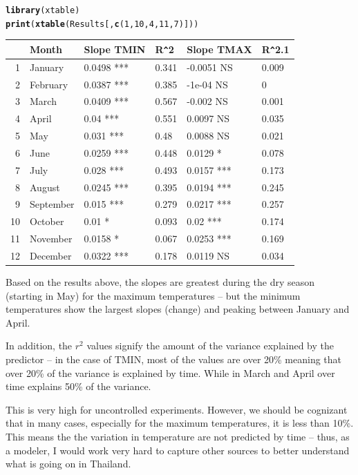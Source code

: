 \documentclass{article}\usepackage[]{graphicx}\usepackage[]{color}
\makeatletter
\newcommand{\hlnum}[1]{\textcolor[rgb]{0.686,0.059,0.569}{#1}}%
\newcommand{\hlstd}[1]{\textcolor[rgb]{0.345,0.345,0.345}{#1}}%
\newcommand{\hlkwd}[1]{\textcolor[rgb]{0.737,0.353,0.396}{\textbf{#1}}}%
\newenvironment{kframe}{%
 \def\at@end@of@kframe{}%
 \ifinner\ifhmode%
  \def\at@end@of@kframe{\end{minipage}}%
  \begin{minipage}{\columnwidth}%
 \fi\fi%
 \def\FrameCommand##1{\hskip\@totalleftmargin \hskip-\fboxsep
 \colorbox{shadecolor}{##1}\hskip-\fboxsep
     \hskip-\linewidth \hskip-\@totalleftmargin \hskip\columnwidth}%
 \MakeFramed {\advance\hsize-\width
   \@totalleftmargin\z@ \linewidth\hsize
   \@setminipage}}%
 {\par\unskip\endMakeFramed%
 \at@end@of@kframe}
\makeatother
\begin{document}
\begin{enumerate}
\begin{kframe}
\begin{alltt}
\hlkwd{library}\hlstd{(xtable)}
\hlkwd{print}\hlstd{(}\hlkwd{xtable}\hlstd{(Results[,}\hlkwd{c}\hlstd{(}\hlnum{1}\hlstd{,} \hlnum{10}\hlstd{,} \hlnum{4}\hlstd{,} \hlnum{11}\hlstd{,} \hlnum{7}\hlstd{)]))}
\end{alltt}
\end{kframe}%
\begin{table}[ht]
\centering
\begin{tabular}{rlllll}
  \hline
 & Month & Slope TMIN & R\verb|^|2 & Slope TMAX & R\verb|^|2.1 \\ 
  \hline
1 & January & 0.0498 *** & 0.341 & -0.0051 NS & 0.009 \\ 
  2 & February & 0.0387 *** & 0.385 & -1e-04 NS & 0 \\ 
  3 & March & 0.0409 *** & 0.567 & -0.002 NS & 0.001 \\ 
  4 & April & 0.04 *** & 0.551 & 0.0097 NS & 0.035 \\ 
  5 & May & 0.031 *** & 0.48 & 0.0088 NS & 0.021 \\ 
  6 & June & 0.0259 *** & 0.448 & 0.0129 * & 0.078 \\ 
  7 & July & 0.028 *** & 0.493 & 0.0157 *** & 0.173 \\ 
  8 & August & 0.0245 *** & 0.395 & 0.0194 *** & 0.245 \\ 
  9 & September & 0.015 *** & 0.279 & 0.0217 *** & 0.257 \\ 
  10 & October & 0.01 * & 0.093 & 0.02 *** & 0.174 \\ 
  11 & November & 0.0158 * & 0.067 & 0.0253 *** & 0.169 \\ 
  12 & December & 0.0322 *** & 0.178 & 0.0119 NS & 0.034 \\ 
   \hline
\end{tabular}
\end{table}


Based on the results above, the slopes are greatest during the dry season (starting in May) for the maximum temperatures -- but the minimum temperatures show the largest slopes (change) and peaking between January and April.  

In addition, the $r^2$ values signify the amount of the variance explained by the predictor -- in the case of TMIN, most of the values are over 20\% meaning that over 20\% of the variance is explained by time. While in March and April over time explains 50\% of the variance. 

This is very high for uncontrolled experiments. However, we should be cognizant that in many cases, especially for the maximum temperatures, it is less than 10\%. This means the the variation in temperature are not predicted by time -- thus, as a modeler, I would work very hard to capture other sources to better understand what is going on in Thailand. 


\end{enumerate}
\end{document}
